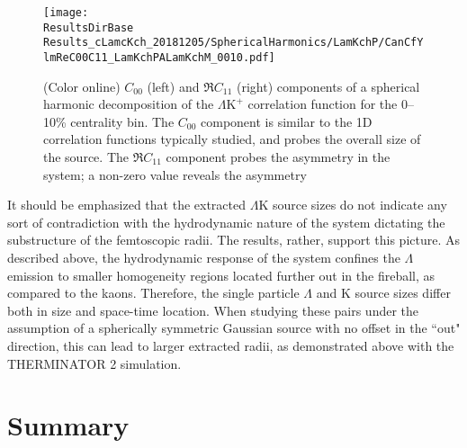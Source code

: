 \documentclass[ALICE,manyauthors]{cernphprep}
\newcommand{\ResultsDirBase}{/home/jesse/Analysis/FemtoAnalysis/Results/}
\newcommand{\Lam}{$\Lambda$\xspace}
\newcommand{\LamK}{$\Lambda$K\xspace}
\newcommand{\LamKchP}{$\Lambda\mathrm{K^{+}}$\xspace}
\begin{document}
\begin{figure}[h!]
  \centering
  \texttt{[image: \\ResultsDirBase Results\_cLamcKch\_20181205/SphericalHarmonics/LamKchP/CanCfYlmReC00C11\_LamKchPALamKchM\_0010.pdf]}
  \caption[\LamKchP $C_{00}$ and $\Re C_{11}$ Spherical Harmonic Components (0--10\%)]
  {
  (Color online) $C_{00}$ (left) and $\Re C_{11}$ (right) components of a spherical harmonic decomposition of the \LamKchP correlation function for the 0--10\% centrality bin.  
The $C_{00}$ component is similar to the 1D correlation functions typically studied, and probes the overall size of the source.
The $\Re C_{11}$ component probes the asymmetry in the system; a non-zero value reveals the asymmetry
  }
  \label{fig:LamKchP_ReC00C11_0010}
\end{figure}

It should be emphasized that the extracted \LamK source sizes do not indicate any sort of contradiction with the hydrodynamic nature of the system dictating the substructure of the femtoscopic radii.
The results, rather, support this picture.
As described above, the hydrodynamic response of the system confines the \Lam emission to smaller homogeneity regions located further out in the fireball, as compared to the kaons.
Therefore, the single particle \Lam and K source sizes differ both in size and space-time location.
When studying these pairs under the assumption of a spherically symmetric Gaussian source with no offset in the ``out" direction, this can lead to larger extracted radii, as demonstrated above with the THERMINATOR 2 simulation.

\section{Summary}
\label{sec:Summary}
\end{document}
